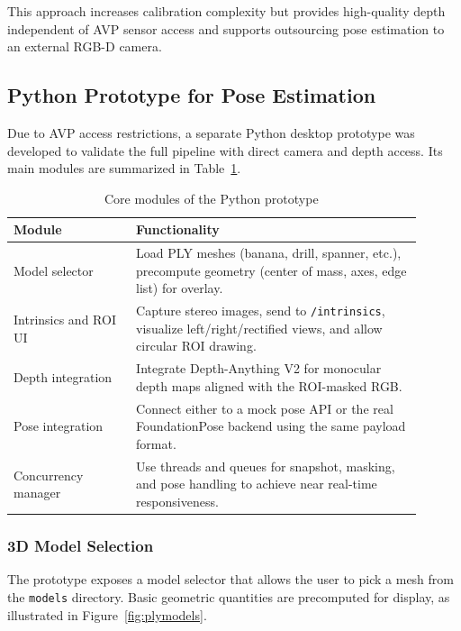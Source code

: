 This approach increases calibration complexity but provides high-quality depth independent of AVP sensor access and supports outsourcing pose estimation to an external RGB-D camera.

\subsection{Python Prototype for Pose Estimation}
\label{subsec:python-prototype}

Due to AVP access restrictions, a separate Python desktop prototype was developed to validate the full pipeline with direct camera and depth access. Its main modules are summarized in Table~\ref{tab:python-modules}.

\begin{table}[H]
    \centering
    \caption{Core modules of the Python prototype}
    \label{tab:python-modules}
    \begin{tabular}{p{0.27\linewidth}p{0.63\linewidth}}
        \toprule
        \textbf{Module} & \textbf{Functionality} \\
        \midrule
        Model selector &
        Load PLY meshes (banana, drill, spanner, etc.), precompute geometry (center of mass, axes, edge list) for overlay. \\
        Intrinsics and ROI UI &
        Capture stereo images, send to \texttt{/intrinsics}, visualize left/right/rectified views, and allow circular ROI drawing. \\
        Depth integration &
        Integrate Depth-Anything V2 for monocular depth maps aligned with the ROI-masked RGB. \\
        Pose integration &
        Connect either to a mock pose API or the real FoundationPose backend using the same payload format. \\
        Concurrency manager &
        Use threads and queues for snapshot, masking, and pose handling to achieve near real-time responsiveness. \\
        \bottomrule
    \end{tabular}
\end{table}

\subsubsection{3D Model Selection}

The prototype exposes a model selector that allows the user to pick a mesh from the \texttt{models} directory. Basic geometric quantities are precomputed for display, as illustrated in Figure~\ref{fig:plymodels}.

